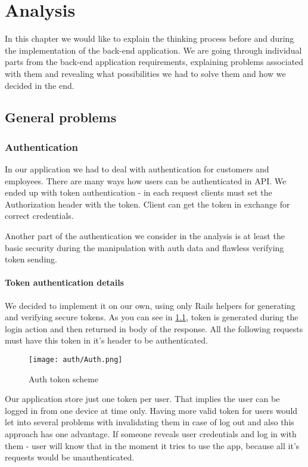 \chapter{Analysis}
In this chapter we would like to explain the thinking process before and during the implementation of the back-end application. We are going through individual parts from the back-end application requirements, explaining problems associated with them and revealing what possibilities we had to solve them and how we decided in the end.

\section{General problems}
\subsection{Authentication}
In our application we had to deal with authentication for customers and employees. There are many ways how users can be authenticated in API. We ended up with token authentication - in each request clients must set the Authorization header with the token. Client can get the token in exchange for correct credentials.

Another part of the authentication we consider in the analysis is at least the basic security during the manipulation with auth data and flawless verifying token sending.

\subsubsection{Token authentication details}

We decided to implement it on our own, using only Rails helpers for generating and verifying secure tokens. As you can see in \ref{auth-token-scheme}, token is generated during the login action and then returned in body of the response. All the following requests must have this token in it's header to be authenticated.

\begin{figure}[h]\centering
\texttt{[image: auth/Auth.png]} 
\caption{Auth token scheme}\label{auth-token-scheme}
\end{figure}

Our application store just one token per user. That implies the user can be logged in from one device at time only. Having more valid token for users would let into several problems with invalidating them in case of log out and also this approach has one advantage. If someone reveals user credentials and log in with them - user will know that in the moment it tries to use the app, because all it's requests would be unauthenticated.

